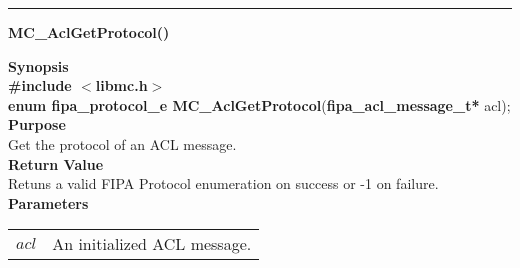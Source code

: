 \noindent
\vspace{5pt}
\rule{6.5in}{0.015in}
\noindent
{}
{\LARGE \bf MC\_AclGetProtocol()}\\
\label{api:MC_Acl_SetProtocol()}

\noindent
{\bf Synopsis}\\
{\bf \#include $<$libmc.h$>$}\\
{\bf enum fipa\_protocol\_e MC\_AclGetProtocol}({\bf fipa\_acl\_message\_t*} acl);\\

\noindent
{\bf Purpose}\\
Get the protocol of an ACL message.\\

\noindent
{\bf Return Value}\\
Retuns a valid FIPA Protocol enumeration on success or -1 on failure.\\

\noindent
{\bf Parameters}
\vspace{-0.1in}
\begin{description}
\item
\begin{tabular}{p{10 mm}p{145 mm}} 
$acl$ & An initialized ACL message. 
\end{tabular}
\end{description}

